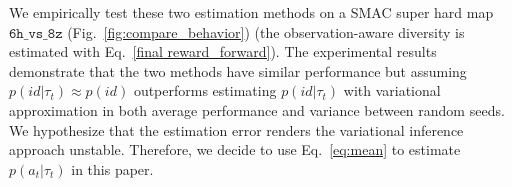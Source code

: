 We empirically test these two estimation methods on a SMAC super hard map $\mathtt{6h\_vs\_8z}$ (Fig.~\ref{fig:compare_behavior}) (the observation-aware diversity is estimated with Eq.~\ref{final reward_forward}). The experimental results demonstrate that the two methods have similar performance but assuming $p\left(i d | \tau_{t}\right) \approx p\left(i d\right)$ outperforms estimating $p\left(i d | \tau_{t}\right)$ with variational approximation in both average performance and variance between random seeds. We hypothesize that the estimation error renders the variational inference approach unstable. Therefore, we decide to use Eq.~\ref{eq:mean} to estimate $p\left(a_{t} | \tau_{t}\right)$ in this paper.







